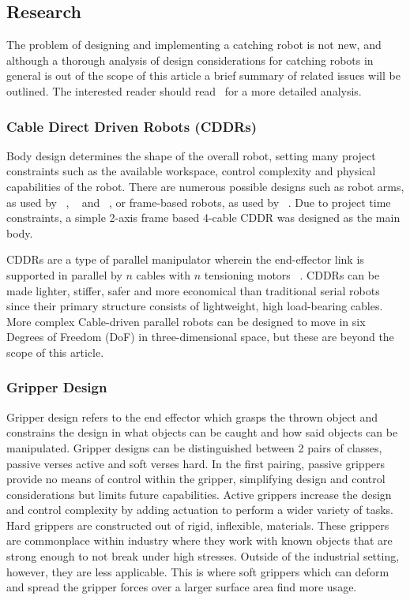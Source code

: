 \documentclass[conference]{IEEEtran}
\begin{document}
\subsection{Research}\label{research}
The problem of designing and implementing a catching robot is not new, and although a thorough analysis of design considerations for catching robots in general is out of the scope of this article a brief summary of related issues will be outlined. The interested reader should read~\cite{Sorg2003VisualTA} for a more detailed analysis.

\subsubsection{Cable Direct Driven Robots (CDDRs)}
Body design determines the shape of the overall robot, setting many project constraints such as the available workspace, control complexity and physical capabilities of the robot. There are numerous possible designs such as robot arms, as used by ~\cite{6810147}, ~\cite{malzahn2014modeling} and ~\cite{5980073}, or frame-based robots, as used by ~\cite{6385963}. Due to project time constraints, a simple 2-axis frame based 4-cable CDDR was designed as the main body.

CDDRs are a type of parallel manipulator wherein the end-effector link is supported in parallel by $n$ cables with $n$ tensioning motors ~\cite{CDDR:description}. CDDRs can be made lighter, stiffer, safer and more economical than traditional serial robots~\cite{WilliamsII2003} since their primary structure consists of lightweight, high load-bearing cables. More complex Cable-driven parallel robots can be designed to move in six Degrees of Freedom (DoF) in three-dimensional space, but these are beyond the scope of this article. 

\subsubsection{Gripper Design}
Gripper design refers to the end effector which grasps the thrown object and constrains the design in what objects can be caught and how said objects can be manipulated. Gripper designs can be distinguished between 2 pairs of classes, passive verses active and soft verses hard.
In the first pairing, passive grippers provide no means of control within the gripper, simplifying design and control considerations but limits future capabilities. Active grippers increase the design and control complexity by adding actuation to perform a wider variety of tasks.
Hard grippers are constructed out of rigid, inflexible, materials. These grippers are commonplace within industry where they work with known objects that are strong enough to not break under high stresses. Outside of the industrial setting, however, they are less applicable. This is where soft grippers which can deform and spread the gripper forces over a larger surface area find more usage.
\end{document}
